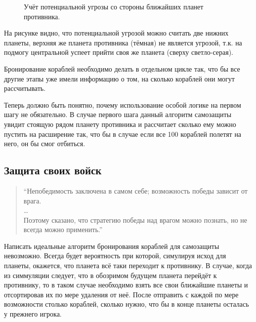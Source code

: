 \documentclass[12pt]{report}
\begin{document}
\begin{figure}[h]
	\centering
	
	\caption{Учёт потенциальной угрозы со стороны ближайших планет противника.	 }
	\label{fig:closetsEnemies}
\end{figure}

На рисунке видно, что потенциальной угрозой можно считать две нижних планеты, верхняя же планета противника (тёмная) не является угрозой, т.к. на подмогу центральной успеет прийти своя же планета (сверху светло-серая).

Бронирование кораблей необходимо делать в отдельном цикле так, что бы все другие этапы уже имели информацию о том, на сколько кораблей они могут рассчитывать.

Теперь должно быть понятно, почему использование особой логике на первом шагу не обязательно. В случае первого шага данный алгоритм самозащиты увидит стоящую рядом планету противника и рассчитает сколько ему можно пустить на расширение так, что бы в случае если все 100 кораблей полетят на него, он бы смог отбиться. 

\subsection{Защита своих войск}
\begin{quote}
``Непобедимость заключена в самом себе; возможность победы зависит от врага.\\
\ldots\\
Поэтому сказано, что стратегию победы над врагом можно познать, но не всегда можно применить.''\\
\citep{tzu1971art}
\end{quote}

Написать идеальные алгоритм бронирования кораблей для самозащиты невозможно. Всегда будет вероятность при которой, симулируя исход для планеты, окажется, что планета всё таки переходит к противнику. В случае, когда из симмуляции следует, что в обозримом будущем планета перейдёт к противнику, то в таком случае необходимо взять все свои ближайшие планеты и отсортировав их по мере удаления от неё. После отправить с каждой по мере возможности столько кораблей, сколько нужно, что бы в конце планеты осталась у прежнего игрока.

\end{document}
